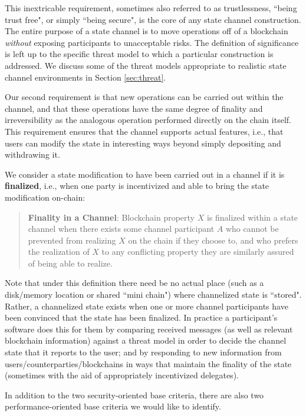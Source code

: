 \documentclass[prb,floatfix,reprint,nofootinbib,amsmath,amssymb,epsfig,pre,floats,letterpaper,groupedaffiliation,tightenlines,allcolors=blue,11pt]{revtex4}
\theoremstyle{definition}
\theoremstyle{definition}
\theoremstyle{definition}
\begin{document}
This inextricable requirement, sometimes also referred to as trustlessness, ``being trust free", or simply ``being secure", is the core of any state channel construction. The entire purpose of a state channel is to move operations off of a blockchain \textit{without} exposing participants to unacceptable risks. The definition of significance is left up to the specific threat model to which a particular construction is addressed.  We discuss some of the threat models appropriate to realistic state channel environments in Section \ref{sec:threat}.

Our second requirement is that new operations can be carried out within the channel, and that these operations have the same degree of finality and irreversibility as the analogous operation performed directly on the chain itself. This requirement ensures that the channel supports actual features, i.e., that users can modify the state in interesting ways beyond simply depositing and withdrawing it.

We consider a state modification to have been carried out in a channel if it is \textbf{finalized}, i.e., when one party is incentivized and able to bring the state modification on-chain:

\begin{quote}
\textbf{Finality in a Channel}: Blockchain property $X$ is finalized within a state channel when there exists some channel participant $A$ who cannot be prevented from realizing $X$ on the chain if they choose to, and who prefers the realization of $X$ to any conflicting property they are similarly assured of being able to realize.
\end{quote}

Note that under this definition there need be no actual place (such as a disk/memory location or shared ``mini chain") where channelized state is ``stored". Rather, a channelized state exists when one or more channel participants have been convinced that the state has been finalized. In practice a participant's software does this for them by comparing received messages (as well as relevant blockchain information) against a threat model in order to decide the channel state that it reports to the user; and by responding to new information from users/counterparties/blockchains in ways that maintain the finality of the state (sometimes with the aid of appropriately incentivized delegates).

In addition to the two security-oriented base criteria, there are also two performance-oriented base criteria we would like to identify.
\end{document}

